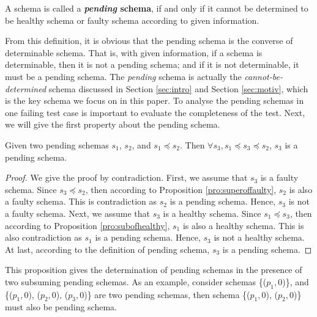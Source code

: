 \begin{definition}\label{de:pending}
A schema is called a \textbf{\emph{pending} schema}, if and only if it cannot be determined to be healthy schema or faulty schema according to given information.
\end{definition}


From this definition, it is obvious that the pending schema is the converse of determinable schema. That is, with given information, if a schema is determinable, then it is not a pending schema; and if it is not determinable, it must be a pending schema. The \emph{pending} schema is actually the \emph{cannot-be-determined} schema discussed in Section \ref{sec:intro} and Section \ref{sec:motiv}, which is the key schema we focus on in this paper. To analyse the pending schemas in one failing test case is important to evaluate the completeness of the test.  Next, we will give the first property about the pending schema.

\begin{proposition}\label{pro:pendingsandwich}
Given two pending schemas $s_{1}$, $s_{2}$, and $s_{1} \preceq s_{2}$. Then $\forall s_{3}, s_{1} \preceq s_{3} \preceq s_{2}$, $s_{3}$ is a pending schema.
\end{proposition}

\begin{proof}
We give the proof by contradiction. First, we assume that $s_{3}$ is a faulty schema. Since $s_{3} \preceq s_{2}$, then according to Proposition \ref{pro:superoffaulty}, $s_{2}$ is also a faulty schema. This is contradiction as $s_{2}$ is a pending schema. Hence, $s_{3}$ is not a faulty schema. Next, we assume that $s_{3}$ is a healthy schema.  Since $s_{1} \preceq s_{3}$, then according to Proposition \ref{pro:subofhealthy}, $s_{1}$ is also a healthy schema. This is also contradiction as $s_{1}$ is a pending schema.  Hence, $s_{3}$ is not a healthy schema. At last, according to the definition of pending schema, $s_{3}$ is a pending schema.
\end{proof}

This proposition gives the determination of pending schemas in the presence of two subsuming pending schemas. As an example, consider schemas \{($p_{1}, 0$)\}, and \{($p_{1}, 0$), ($p_{2}, 0$), ($p_{3}, 0$)\} are two pending schemas, then schema \{($p_{1}, 0$), ($p_{2}, 0$)\} must also be pending schema.

